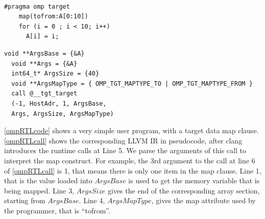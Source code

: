 \begin{minipage}{.40\textwidth}    
\begin{lstlisting}[style=customc, frame=tlrb, caption={Example map clause}, basicstyle=\scriptsize, label=ompRTLcode]

#pragma omp target
    map(tofrom:A[0:10])
    for (i = 0 ; i < 10; i++)
      A[i] = i;
\end{lstlisting}
\end{minipage}\hfill 
\begin{minipage}{.45\textwidth}
\begin{lstlisting}[style=customc, frame=tlrb, caption={Pseudocode for LLVM IR with RTL calls}, basicstyle=\scriptsize, label=ompRTLcall]
  void **ArgsBase = {&A}
  void **Args = {&A}
  int64_t* ArgsSize = {40}
  void **ArgsMapType = { OMP_TGT_MAPTYPE_TO | OMP_TGT_MAPTYPE_FROM }
  call @__tgt_target
  (-1, HostAdr, 1, ArgsBase, 
  Args, ArgsSize, ArgsMapType) 
\end{lstlisting}
\end{minipage}

\autoref{ompRTLcode} shows a very simple user program, with a target data map clause. 
\autoref{ompRTLcall} shows the corresponding LLVM IR in
pseudocode, after clang introduces the runtime calls at  
Line 5.
We parse the arguments 
of this call to interpret the map construct. 
For example, the 3rd argument to the call at line 6 of \autoref{ompRTLcall} is 1, that means there
is only one item in the map clause. Line 1, that is the value loaded into $ArgsBase$ 
is used to get the memory variable that is being mapped. Line 3, $ArgsSize$ gives
the end of the corresponding array section, starting from $ArgsBase$. 
Line 4, $ArgsMapType$, gives the map attribute used by the programmer,
that is ``tofrom''.

